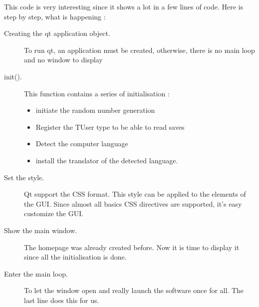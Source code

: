 This code is very interesting since it shows a lot in a few lines of code. Here is step by step, what is happening :
\begin{description}
	\item[Creating the qt application object.] To run qt, an application must be created, otherwise, there is no main loop and no window to display
	\item[init().]  This function contains a series of initialisation :
	\begin{itemize}
		\item initiate the random number generation
		\item Register the TUser type to be able to read saves
		\item Detect the computer language
		\item install the translator of the detected language.
	\end{itemize}
	\item[Set the style.] Qt support the CSS format. This style can be applied to the elements of the GUI. Since almost all basics CSS directives are supported, it's easy customize the GUI.
	\item[Show the main window.] The homepage was already created before. Now  it is time to display it since all the initialisation is done.
	\item[Enter the main loop.] To let the window open and really launch the software once for all. The last line does this for us.
\end{description}


